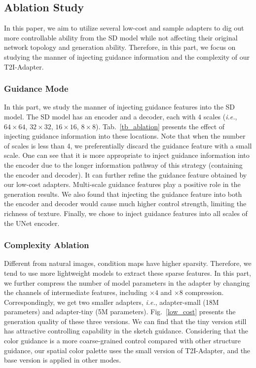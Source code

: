 \subsection{Ablation Study}

In this paper, we aim to utilize several low-cost and sample adapters to dig out more controllable ability from the SD model while not affecting their original network topology and generation ability. Therefore, in this part, we focus on studying the manner of injecting guidance information and the complexity of our T2I-Adapter. 

\subsubsection{Guidance Mode} In this part, we study the manner of injecting guidance features into the SD model. The SD model has an encoder and a decoder, each with $4$ scales (\textit{i.e.}, $64\times 64$, $32\times 32$, $16\times 16$, $8\times 8$). Tab.~\ref{tb_ablation} presents the effect of injecting guidance information into these locations. Note that when the number of scales is less than 4, we preferentially discard the guidance feature with a small scale. One can see that it is more appropriate to inject guidance information into the encoder due to the longer information pathway of this strategy (containing the encoder and decoder). It can further refine the guidance feature obtained by our low-cost adapters. Multi-scale guidance features play a positive role in the generation results. We also found that injecting the guidance feature into both the encoder and decoder would cause much higher control strength, limiting the richness of texture. Finally, we chose to inject guidance features into all scales of the UNet encoder.

\subsubsection{Complexity Ablation} Different from natural images, condition maps have higher sparsity. Therefore, we tend to use more lightweight models to extract these sparse features. In this part, we further compress the number of model parameters in the adapter by changing the channels of intermediate features, including $\times 4$ and $\times 8$ compression. Correspondingly, we get two smaller adapters, \textit{i.e.}, adapter-small (18M parameters) and adapter-tiny (5M parameters). Fig.~\ref{low_cost} presents the generation quality of these three versions. We can find that the tiny version still has attractive controlling capability in the sketch guidance. Considering that the color guidance is a more coarse-grained control compared with other structure guidance, our spatial color palette uses the small version of T2I-Adapter, and the base version is applied in other modes.

